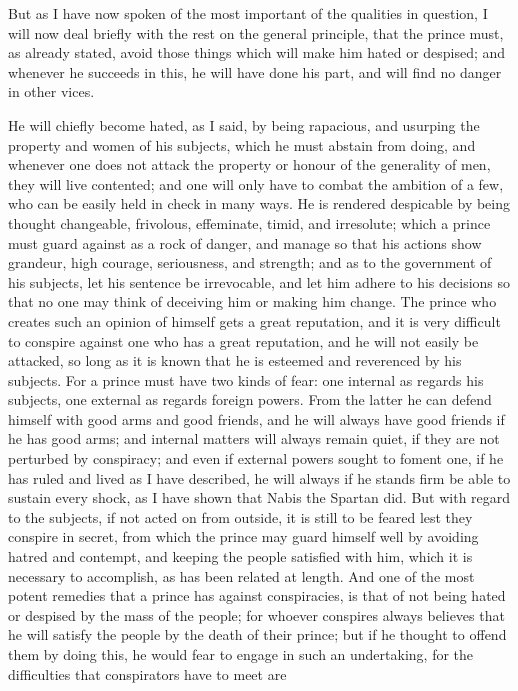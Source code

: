 \documentclass[12pt,letterpaper]{memoir}
\begin{document}
But as I have now spoken of the most important of the qualities
in question, I will now deal briefly with the rest on the general
principle, that the prince must, as already stated, avoid those things
which will make him hated or despised; and whenever he succeeds in
this, he will have done his part, and will find no danger in other
vices.

He will chiefly become hated, as I said, by being rapacious, and
usurping the property and women of his subjects, which he must abstain
from doing, and whenever one does not attack the property or honour
of the generality of men, they will live contented; and one will only
have to combat the ambition of a few, who can be easily held in check
in many ways. He is rendered despicable by being thought changeable,
frivolous, effeminate, timid, and irresolute; which a prince must
guard against as a rock of danger, and manage so that his actions
show grandeur, high courage, seriousness, and strength; and as to the
government of his subjects, let his sentence be irrevocable, and let
him adhere to his decisions so that no one may think of deceiving him
or making him change. The prince who creates such an opinion of himself
gets a great reputation, and it is very difficult to conspire against
one who has a great reputation, and he will not easily be attacked, so
long as it is known that he is esteemed and reverenced by his subjects.
For a prince must have two kinds of fear: one internal as regards his
subjects, one external as regards foreign powers. From the latter he
can defend himself with good arms and good friends, and he will always
have good friends if he has good arms; and internal matters will always
remain quiet, if they are not perturbed by conspiracy; and even if
external powers sought to foment one, if he has ruled and lived as I
have described, he will always if he stands firm be able to sustain
every shock, as I have shown that Nabis the Spartan did. But with
regard to the subjects, if not acted on from outside, it is still to be
feared lest they conspire in secret, from which the prince may guard
himself well by avoiding hatred and contempt, and keeping the people
satisfied with him, which it is necessary to accomplish, as has been
related at length. And one of the most potent remedies that a prince
has against conspiracies, is that of not being hated or despised by
the mass of the people; for whoever conspires always believes that
he will satisfy the people by the death of their prince; but if he
thought to offend them by doing this, he would fear to engage in such
an undertaking, for the difficulties that conspirators have to meet are
\end{document}
